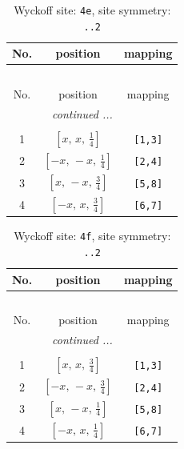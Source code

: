 \documentclass[fleqn,8pt]{jsarticle}
\begin{document}
\begin{longtable}{ccc}
\caption{Wyckoff site: {\tt 4e}, site symmetry: {\tt ..2}}
 \\
 \hline \hline
No. & position & mapping \\ \hline \endfirsthead

\multicolumn{2}{l}{\tablename\ \thetable{}} \\
 \hline \hline
No. & position & mapping \\ \hline \endhead

 \hline \hline
\multicolumn{2}{r}{\footnotesize\it continued ...} \\ \endfoot

 \hline \hline
\multicolumn{2}{r}{} \\ \endlastfoot

1 & $\left[ x,\, x,\, \frac{1}{4} \right]$ & {\tt [1,3]} \\ \hline
2 & $\left[ - x,\, - x,\, \frac{1}{4} \right]$ & {\tt [2,4]} \\ \hline
3 & $\left[ x,\, - x,\, \frac{3}{4} \right]$ & {\tt [5,8]} \\ \hline
4 & $\left[ - x,\, x,\, \frac{3}{4} \right]$ & {\tt [6,7]} \\
\end{longtable}
\renewcommand{\arraystretch}{1.2}
\begin{longtable}{ccc}
\caption{Wyckoff site: {\tt 4f}, site symmetry: {\tt ..2}}
 \\
 \hline \hline
No. & position & mapping \\ \hline \endfirsthead

\multicolumn{2}{l}{\tablename\ \thetable{}} \\
 \hline \hline
No. & position & mapping \\ \hline \endhead

 \hline \hline
\multicolumn{2}{r}{\footnotesize\it continued ...} \\ \endfoot

 \hline \hline
\multicolumn{2}{r}{} \\ \endlastfoot

1 & $\left[ x,\, x,\, \frac{3}{4} \right]$ & {\tt [1,3]} \\ \hline
2 & $\left[ - x,\, - x,\, \frac{3}{4} \right]$ & {\tt [2,4]} \\ \hline
3 & $\left[ x,\, - x,\, \frac{1}{4} \right]$ & {\tt [5,8]} \\ \hline
4 & $\left[ - x,\, x,\, \frac{1}{4} \right]$ & {\tt [6,7]} \\
\end{longtable}
\end{document}
